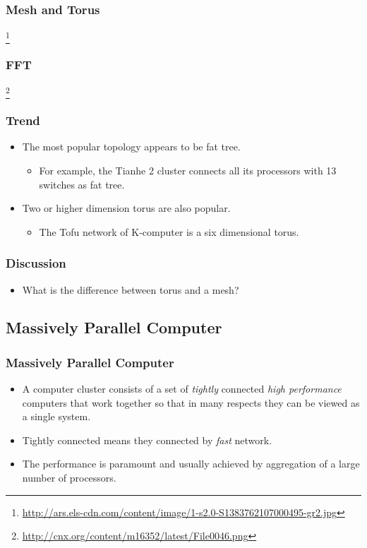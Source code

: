 \documentclass{beamer}
\begin{document}
\begin{CJK}{UTF8}{bsmi}
\begin{frame}
\frametitle{Mesh and Torus}
\centerline{}
\footnote{\url{http://ars.els-cdn.com/content/image/1-s2.0-S1383762107000495-gr2.jpg}}
\end{frame}

\begin{frame}
\frametitle{FFT}
\centerline{}
\footnote{\url{http://cnx.org/content/m16352/latest/File0046.png}}
\end{frame}

\begin{frame}
\frametitle{Trend}
\begin{itemize}
\item The most popular topology appears to be fat tree.
\begin{itemize}
\item For example, the Tianhe 2 cluster connects all its processors
  with 13 switches as fat tree.
\end{itemize}
\item Two or higher dimension torus are also popular.
\begin{itemize}
\item The Tofu network of K-computer is a six dimensional torus.
\end{itemize}
\end{itemize}
\end{frame}

\begin{frame}
\frametitle{Discussion}
\begin{itemize}
\item What is the difference between torus and a mesh?
\end{itemize}
\end{frame}

\subsection{Massively Parallel Computer}

\begin{frame}
\frametitle{Massively Parallel Computer}
\begin{itemize}
\item A computer cluster consists of a set of {\em tightly} connected
  {\em high performance} computers that work together so that in many
  respects they can be viewed as a single system.
\item Tightly connected means they connected by {\em fast}
  network.
\item The performance is paramount and usually achieved by
  aggregation of a large number of processors.
\end{itemize}
\end{frame}


\end{CJK}
\end{document}
